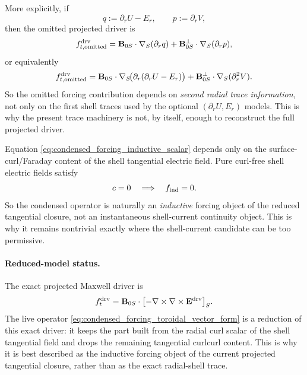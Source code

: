 \documentclass[11pt,a4paper]{article}
\begin{document}
More explicitly, if
\[
q := \partial_r U - E_r,
\qquad
p := \partial_r V,
\]
then the omitted projected driver is
\begin{equation}
f_{t,\rm omitted}^{\rm drv}
=
\mathbf B_{0S}\cdot \nabla_S(\partial_r q)
+
\mathbf B_{0S}^{\perp}\cdot \nabla_S(\partial_r p),
\label{eq:projected_driver_omitted_second_trace_form}
\end{equation}
or equivalently
\begin{equation}
f_{t,\rm omitted}^{\rm drv}
=
\mathbf B_{0S}\cdot \nabla_S\!\bigl(\partial_r(\partial_r U - E_r)\bigr)
+
\mathbf B_{0S}^{\perp}\cdot \nabla_S(\partial_r^2 V).
\label{eq:projected_driver_omitted_second_trace_expanded}
\end{equation}
So the omitted forcing contribution depends on \emph{second radial trace
information}, not only on the first shell traces used by the optional
\((\partial_r U,E_r)\) models. This is why the present trace machinery is not,
by itself, enough to reconstruct the full projected driver.

Equation \eqref{eq:condensed_forcing_inductive_scalar} depends only on the
surface-curl/Faraday content of the shell tangential electric field. Pure
curl-free shell electric fields satisfy
\[
c = 0
\quad\Longrightarrow\quad
f_{\rm ind}=0.
\]
So the condensed operator is naturally an \emph{inductive} forcing object of
the reduced tangential closure, not an instantaneous shell-current continuity
object. This is why it remains nontrivial exactly where the shell-current
candidate can be too permissive.

\paragraph{Reduced-model status.}
The exact projected Maxwell driver is
\[
f_t^{\rm drv}
=
\mathbf B_{0S}\cdot\bigl[-\nabla\times\nabla\times \mathbf E^{\rm drv}\bigr]_S.
\]
The live operator \eqref{eq:condensed_forcing_toroidal_vector_form} is a
reduction of this exact driver: it keeps the part built from the radial curl
scalar of the shell tangential field and drops the remaining tangential
curlcurl content. This is why it is best described as the inductive forcing
object of the current projected tangential closure, rather than as the exact
radial-shell trace.
\end{document}
